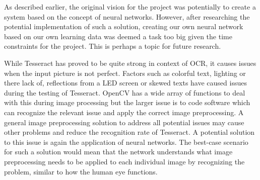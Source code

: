 \documentclass[../main.tex]{subfiles}
\begin{document}
As described earlier, the original vision for the project was potentially to create a system based on the concept of neural networks. However, after researching the potential implementation of such a solution, creating our own neural network based on our own learning data was deemed a task too big given the time constraints for the project. This is perhaps a topic for future research. 

While Tesseract has proved to be quite strong in context of OCR, it causes issues when the input picture is not perfect. Factors such as colorful text, lighting or there lack of, reflections from a LED screen or skewed texts have caused issues during the testing of Tesseract. OpenCV has a wide array of functions to deal with this during image processing but the larger issue is to code software which can recognize the relevant issue and apply the correct image preprocessing. A general image preprocessing solution to address all potential issues may cause other problems and reduce the recognition rate of Tesseract. A potential solution to this issue is again the application of neural networks. The best-case scenario for such a solution would mean that the network understands what image preprocessing needs to be applied to each individual image by recognizing the problem, similar to how the human eye functions.
\end{document}
